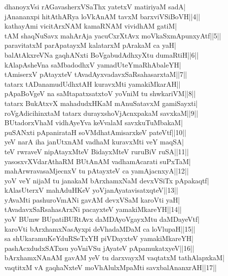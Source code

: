 \documentclass{article}
\begin{document}
dhanoyxVsi rAGavasherxVSaThx yatetxV matiriyaM sadA|\\
jAnananxpi hitAthARya loVkAnAM tavxM barxviVSiBoVH||4||\\
kathayAmi vicitArxNAM kamaRNAM vividhAM gatiM|\\
tAM shaqNuSavx mahArAja yacuCxrXtAvx moVkaSxmApunxyAtf||5||\\
paravitatxM parApatayxM kalatarxM pArakaM ca yaH|\\
balAtAkxreVNa gaqhANxti BoVgabudAdhxyXtu dumaRtiH||6||\\
kAlapAsheVna saMbadodhxV yamadUteYmaRhAbaleYH|\\
tAmiserxV pAtayxteV tAvadAyxvadavxSaRsahasarxtaM||7||\\
tatarx tADanamudUdhxtAH kuravxMti yamakiMkarAH||\\
pApaBoVgeV na saMtapatxsatxtoV yoVniM tu shwkariVM||8||\\
tatarx BukAtxvX mahadudxHKaM mAnuSatavxM gamiSayxti|\\
roVgAdicihinxtaM tatarx durayxshoVjAcnxpakaM savxkaM||9||\\
BUtadorxVhaM vidhAyeYva keVvalaM savxkuTuMbakaM|\\
puSANxti pApanirataH soVMdhatAmisarxkeV pateVtf||10||\\
yeV narA iha janUtxnAM vadhaM kuravxMti veY maqSA|\\
teV rwraveV nipAtayxMteV BidayxMteV ruruBiV ruSA||11||\\
yasosxvXVdarAthaRM BUtAnAM vadhamAcarati suPxTaM|\\
mahArwravasaMjecnxV tu pAtayxteV ca yamAjacnxyA||12||\\
yoV veY nijaM tu janakaM bArxhamxNaM devxVSiTx pApakaqtf|\\
kAlasUterxV mahAduHKeV yoVjanAyatavisatxqteV||13||\\
yAvaMti pashuroVmANi gavAM devxVSaM karoVti yaH|\\
tAvadavxSaRsahasArxNi pacayxteV yamakiMkareYH||14||\\
yoV BUmw BUpatiBURtAvx daMDAyoVgayxMtu daMDayeVtf|\\
karoVti bArxhamxNasAyxpi deVhadaMDaM ca loVlupaH||15||\\
sa shUkaramuKeYduRSeTxYH piVDayxteV yamakiMkareYH|\\
pashAcxdudxSATxsu yoVniVSu jAyateV pApamukatxyeV||16||\\
bArxhamxNAnAM gavAM yeV tu darxvayxM vaqtatxM tathAlapxkaM|\\
vaqtitxM vA gaqhaNxteV moVhAlulxMpaMti savxbalAnanxrAH||17||\\
\end{document}
